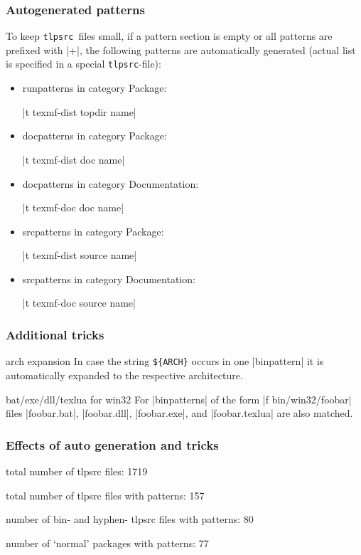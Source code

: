 \documentclass{beamer}
\newcommand{\tlpsrc}{\texttt{tlpsrc}}
\begin{document}
\begin{frame}
  \frametitle{Autogenerated patterns}
  To keep \tlpsrc\ files small, if a pattern section is empty or all
  patterns are prefixed with |+|, the following patterns are
  automatically generated (actual list is specified in a special
  \tlpsrc-file): 
  \begin{itemize}
  \item runpatterns in category Package:
    \begin{center}
      |t texmf-dist topdir name|
    \end{center}
  \item docpatterns in category Package:
    \begin{center}
      |t texmf-dist doc name|
    \end{center}
  \item docpatterns in category Documentation:
    \begin{center}
      |t texmf-doc doc name|
    \end{center}
  \item srcpatterns in category Package:
    \begin{center}
      |t texmf-dist source name|
    \end{center}
  \item srcpatterns in category Documentation:
    \begin{center}
      |t texmf-doc source name|
    \end{center}
  \end{itemize}
\end{frame}

\begin{frame}[fragile]
  \frametitle{Additional tricks}

  \begin{block}{arch expansion}
  In case the string \verb+${ARCH}+ occurs in one |binpattern| it is 
  automatically expanded to the respective architecture.
  \end{block}

  \begin{block}{bat/exe/dll/texlua for win32}
    For |binpatterns| of the form |f bin/win32/foobar| files
    |foobar.bat|, |foobar.dll|, |foobar.exe|, and |foobar.texlua| are
    also matched.
  \end{block}
\end{frame}

\begin{frame}
  \frametitle{Effects of auto generation and tricks}

  total number of tlpsrc files: 1719
  
  total number of tlpsrc files with patterns: 157
  
  number of bin- and hyphen- tlpsrc files with patterns: 80
  
  number of `normal' packages with patterns: 77
\end{frame}
\end{document}
